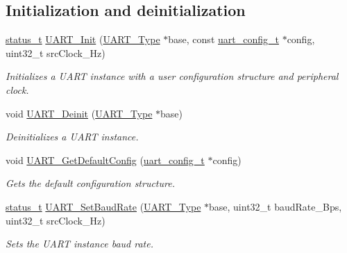 \subsection*{Initialization and deinitialization}
\begin{DoxyCompactItemize}
\item 
\mbox{\hyperlink{group__ksdk__common_gaaabdaf7ee58ca7269bd4bf24efcde092}{status\+\_\+t}} \mbox{\hyperlink{group__uart__driver_gab5965a8e11f7e1d4d531141291fd5288}{U\+A\+R\+T\+\_\+\+Init}} (\mbox{\hyperlink{struct_u_a_r_t___type}{U\+A\+R\+T\+\_\+\+Type}} $\ast$base, const \mbox{\hyperlink{group__uart__driver_ga032da70848aac8bc9c3904a32bde5899}{uart\+\_\+config\+\_\+t}} $\ast$config, uint32\+\_\+t src\+Clock\+\_\+\+Hz)
\begin{DoxyCompactList}\small\item\em Initializes a U\+A\+RT instance with a user configuration structure and peripheral clock. \end{DoxyCompactList}\item 
void \mbox{\hyperlink{group__uart__driver_ga3ff48bc211831be33e6fe5c50eb671a0}{U\+A\+R\+T\+\_\+\+Deinit}} (\mbox{\hyperlink{struct_u_a_r_t___type}{U\+A\+R\+T\+\_\+\+Type}} $\ast$base)
\begin{DoxyCompactList}\small\item\em Deinitializes a U\+A\+RT instance. \end{DoxyCompactList}\item 
void \mbox{\hyperlink{group__uart__driver_ga47c7c09e04a0497f4530d553e27d96c5}{U\+A\+R\+T\+\_\+\+Get\+Default\+Config}} (\mbox{\hyperlink{group__uart__driver_ga032da70848aac8bc9c3904a32bde5899}{uart\+\_\+config\+\_\+t}} $\ast$config)
\begin{DoxyCompactList}\small\item\em Gets the default configuration structure. \end{DoxyCompactList}\item 
\mbox{\hyperlink{group__ksdk__common_gaaabdaf7ee58ca7269bd4bf24efcde092}{status\+\_\+t}} \mbox{\hyperlink{group__uart__driver_gab3ba5019c11f288cc4f545dd656b6284}{U\+A\+R\+T\+\_\+\+Set\+Baud\+Rate}} (\mbox{\hyperlink{struct_u_a_r_t___type}{U\+A\+R\+T\+\_\+\+Type}} $\ast$base, uint32\+\_\+t baud\+Rate\+\_\+\+Bps, uint32\+\_\+t src\+Clock\+\_\+\+Hz)
\begin{DoxyCompactList}\small\item\em Sets the U\+A\+RT instance baud rate. \end{DoxyCompactList}\end{DoxyCompactItemize}
